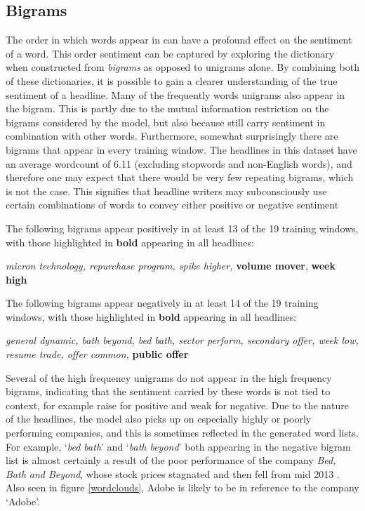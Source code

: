 \subsection{Bigrams}
\label{sub:bigram-analysis}
The order in which words appear in can have a profound effect on the sentiment of a word. This order sentiment can be captured by exploring the dictionary when constructed from \textit{bigrams} as opposed to unigrams alone. By combining both of these dictionaries, it is possible to gain a clearer understanding of the true sentiment of a headline. Many of the frequently  words unigrams also appear in the bigram. This is partly due to the mutual information restriction on the bigrams considered by the model, but also because still carry sentiment in combination with other words. Furthermore, somewhat surprisingly there are bigrams that appear in every training window. The headlines in this dataset have an average wordcount of 6.11 (excluding stopwords and non-English words), and therefore one may expect that there would be very few repeating bigrams, which is not the case. This signifies that headline writers may subconsciously use certain combinations of words to convey either positive or negative sentiment

The following bigrams appear positively in at least 13 of the 19 training windows, with those highlighted in \textbf{bold} appearing in all headlines:
\begin{center}
\textit{micron technology, repurchase program, spike higher,} \textbf{volume mover}, \textbf{week high}
\end{center}

The following bigrams appear negatively in at least 14 of the 19 training windows, with those highlighted in \textbf{bold} appearing in all headlines:
\begin{center}
      \textit{general dynamic, bath beyond, bed bath, sector perform, secondary offer, week low, resume trade, offer common,} \textbf{public offer}
\end{center}

Several of the high frequency unigrams do not appear in the high frequency bigrams, indicating that the sentiment carried by these words is not tied to context, for example raise for positive and weak for negative. Due to the nature of the headlines, the model also picks up on especially highly or poorly performing companies, and this is sometimes reflected in the generated word lists. For example, `\textit{bed bath}' and `\textit{bath beyond}' both appearing in the negative bigram list is almost certainly a result of the poor performance of the company \textit{Bed, Bath and Beyond}, whose stock prices stagnated and then fell from mid 2013 \parencite{bed-bath-yahoo}. Also seen in figure \ref{wordclouds}, Adobe is likely to be in reference to the company `Adobe'.


